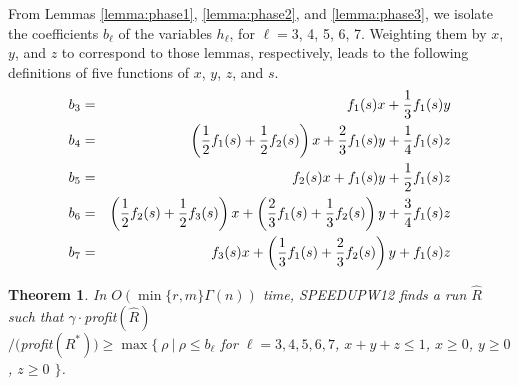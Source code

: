 \documentclass[11pt]{article}
\newtheorem{theorem}{Theorem}[section]
\begin{document}
\begin{comment}
\begin{theorem}
In $O(\min \{r,m\}\Gamma(n))$ time,
SPEEDUPW12 finds a run $\hat{R}$ such that $\gamma\cdot$profit$(\hat{R})$ \\
$/$profit$(R^*) \geq$
$\max \{ ~\rho ~|~ \rho \leq f_1(s)x + {1 \over 3}f_1(s)y,$
\hspace{.1in}$\rho \leq \left( {1 \over 2}f_1(s)+{1 \over 2}f_2(s)
\right) x + {2 \over 3}f_1(s)y + {1 \over 4}f_1(s)z,$\\
\hspace*{.3in}$\rho \leq f_2(s)x + f_1(s)y + {1 \over 2}f_1(s)z,$
\hspace{.1in}$\rho \leq \left( {1 \over 2}f_2(s)+{1 \over 2}f_3(s)
\right) x + \left( {2 \over 3}f_1(s)+{1 \over 3}f_2(s)
\right) y + {3 \over 4}f_1(s)z,$\\
\hspace*{.3in}$\rho \leq f_3(s)x + \left( {1 \over 3}f_1(s)+{2 \over 3}f_2(s)
\right) y + f_1(s)z,$
\hspace{.1in}$x+y+z \leq 1,$\hspace{.1in}$x \geq 0,~y\geq 0,~z \geq 0\}$

\label{thm:LP}
\end{theorem}
\end{comment}

From Lemmas \ref{lemma:phase1}, \ref{lemma:phase2}, and \ref{lemma:phase3}, we isolate the coefficients $b_\ell$ of the variables $h_\ell$, for $\ell = 3$, 4, 5, 6, 7.  Weighting them by $x$, $y$, and $z$ to correspond to those lemmas, respectively, leads to the following definitions of five functions of $x$, $y$, $z$, and $s$.
\begin{eqnarray*}
b_3 & = & f_1(s)x + {1 \over 3}f_1(s)y\\
b_4 & = & \left( {1 \over 2}f_1(s)+{1 \over 2}f_2(s)\right) x + {2 \over 3}f_1(s)y + {1 \over 4}f_1(s)z\\
b_5 & = & f_2(s)x + f_1(s)y + {1 \over 2}f_1(s)z\\
b_6 & = & \left( {1 \over 2}f_2(s)+{1 \over 2}f_3(s)\right) x + \left( {2 \over 3}f_1(s)+{1 \over 3}f_2(s)\right) y + {3 \over 4}f_1(s)z\\
b_7 & = & f_3(s)x + \left( {1 \over 3}f_1(s)+{2 \over 3}f_2(s)\right) y + f_1(s)z
\end{eqnarray*}

\begin{theorem}
In $O(\min \{r,m\}\Gamma(n))$ time,
SPEEDUPW12 finds a run $\hat{R}$ such that $\gamma\cdot$profit$(\hat{R})$ \\
$/($profit$(R^*)) \geq \max \{~\rho~|~\rho \leq b_\ell$ for $\ell = 3,4,5,6,7$, $x + y + z \leq 1$, $x \geq 0$, $y \geq 0$, $z \geq 0$ $\}$.
\label{thm:LP}
\end{theorem}
\end{document}
